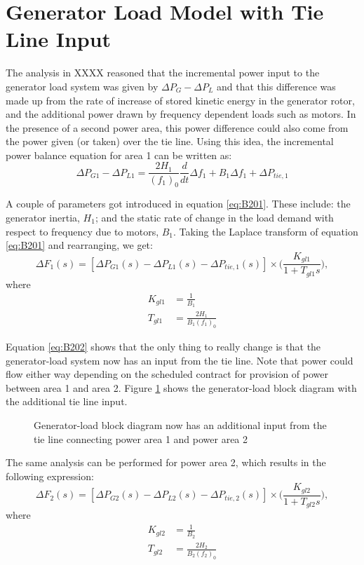 \section{Generator Load Model with Tie Line Input}
The analysis in XXXX reasoned that the incremental power input to the generator load system was given by $\Delta P_G - \Delta P_L$ and that this difference was made up from the rate of increase of stored kinetic energy in the generator rotor, and the additional power drawn by frequency dependent loads such as motors. In the presence of a second power area, this power difference could also come from the power given (or taken) over the tie line. Using this idea, the incremental power balance equation for area 1 can be written as:
\begin{equation}
	\Delta P_{G1} - \Delta P_{L1} = \frac{2 H_1}{(f_1)_0} \frac{d}{dt} \Delta f_1 + B_1 \Delta f_1 + \Delta P_{tie, 1} \label{eq:B201}
\end{equation}

A couple of parameters got introduced in equation \ref{eq:B201}. These include: the generator inertia, $H_1$; and the static rate of change in the load demand with respect to frequency due to motors, $B_1$. Taking the Laplace transform of equation \ref{eq:B201} and rearranging, we get:
\begin{equation}
	\Delta F_1(s) = [\Delta P_{G1}(s) - \Delta P_{L1}(s) - \Delta P_{tie,1}(s)] \times \bigg( \frac{K_{gl1}}{1 + T_{gl1}s} \bigg), \label{eq:B202}
\end{equation}
where
\begin{align}
	K_{gl1} &= \frac{1}{B_1} \\
	T_{gl1} &= \frac{2H_1}{B_1 (f_1)_0}
\end{align}

Equation \ref{eq:B202} shows that the only thing to really change is that the generator-load system now has an input from the tie line. Note that power could flow either way depending on the scheduled contract for provision of power between area 1 and area 2. Figure \ref{fig:B201_generator_load_model_1_with_tie_line} shows the generator-load block diagram with the additional tie line input.

\begin{figure}[h]
	\centering
	
	\caption[Generator-load model for a two or more area power system]{Generator-load block diagram now has an additional input from the tie line connecting power area 1 and power area 2}
	\label{fig:B201_generator_load_model_1_with_tie_line}
\end{figure}

The same analysis can be performed for power area 2, which results in the following expression:
\begin{equation}
	\Delta F_2(s) = [\Delta P_{G2}(s) - \Delta P_{L2}(s) - \Delta P_{tie,2}(s)] \times \bigg( \frac{K_{gl2}}{1 + T_{gl2}s} \bigg), \label{eq:B203}
\end{equation}
where
\begin{align}
	K_{gl2} &= \frac{1}{B_2} \\
	T_{gl2} &= \frac{2H_2}{B_2 (f_2)_0}
\end{align}